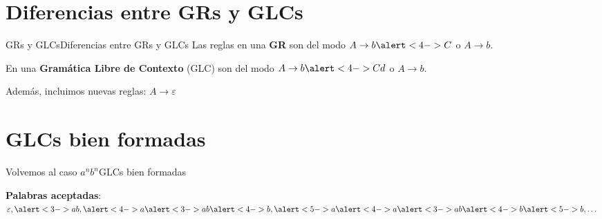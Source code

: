 \documentclass[spanish]{beamer}
\begin{document}
\section{Diferencias entre GRs y GLCs}

\begin{frame}{GRs y GLCs}{Diferencias entre GRs y GLCs}
    Las \alert{reglas} en una \textbf{GR} son del modo $A \to b\alert<4->{C}$ o $A \to b$. \pause

    \bigskip

    En una \textbf{Gramática Libre de Contexto} (GLC) son del modo $A \to b\alert<4->{C}d$ o $A \to b$. \pause

    \bigskip

    Además, incluimos nuevas reglas: $A \to \varepsilon$ \pause
\end{frame}

\section{GLCs bien formadas}

\begin{frame}{Volvemos al caso $a^nb^n$}{GLCs bien formadas}

    \textbf{Palabras aceptadas}: $\varepsilon, \alert<3->{ab}, \alert<4->{a}\alert<3->{ab}\alert<4->{b}, \alert<5->a\alert<4->{a}\alert<3->{ab}\alert<4->{b}\alert<5->{b}, \dots$ \pause

    \bigskip



    \bigskip

    
\end{frame}
\end{document}
